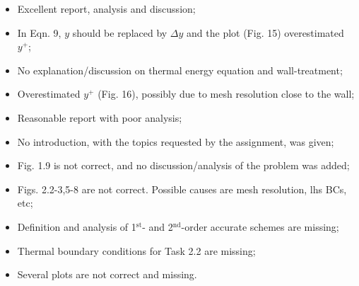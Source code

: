 \documentclass[14pt,twoside]{report}
\newcommand\blankpage{%
    \null
    \thispagestyle{empty}%
    \addtocounter{page}{-1}%
    \newpage}
\begin{document}

\medskip

  \begin{itemize}
%
     \item Excellent report, analysis and discussion;
     \item In Eqn. 9, $y$ should be replaced by $\Delta y$ and the plot (Fig. 15) overestimated $y^{+}$; 
     \item No explanation/discussion on thermal energy equation and wall-treatment;
     \item Overestimated $y^{+}$ (Fig. 16), possibly due to mesh resolution close to the wall;
%
  \end{itemize}%

\clearpage 



\bigskip


\medskip

  \begin{itemize}
%
     \item Reasonable report with poor analysis;
     \item No introduction, with the topics requested by the assignment, was given;
     \item Fig. 1.9 is not correct, and no discussion/analysis of the problem was added;
     \item Figs. 2.2-3,5-8 are not correct. Possible causes are mesh resolution, lhs BCs, etc;
     \item Definition and analysis of 1$^{\text{st}}$- and 2$^{\text{nd}}$-order accurate schemes are missing;
     \item Thermal boundary conditions for Task 2.2 are missing;
     \item Several plots are not correct and missing.
%
  \end{itemize}%

\clearpage 





\bigskip

\end{document}
